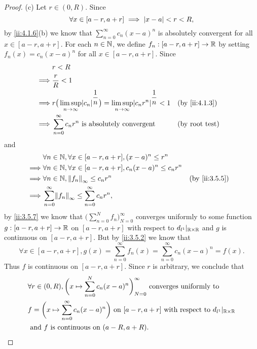 \begin{proof}{(c)}
  Let \(r \in (0, R)\).
  Since
  \[
    \forall x \in [a - r, a + r] \implies \left\lvert x - a\right\rvert < r < R,
  \]
  by \cref{ii:4.1.6}(b) we know that \(\sum_{n = 0}^\infty c_n (x - a)^n\) is absolutely convergent for all \(x \in [a - r, a + r]\).
  For each \(n \in \mathbb{N}\), we define \(f_n : [a - r, a + r] \to \mathbb{R}\) by setting \(f_n(x) = c_n (x - a)^n\) for all \(x \in [a - r, a + r]\).
  Since
  \begin{align*}
             & r < R                                                                                                                                            \\
    \implies & \dfrac{r}{R} < 1                                                                                                                                 \\
    \implies & r \big(\limsup_{n \to \infty} \abs{c_n}^{\dfrac{1}{n}}\big) = \limsup_{n \to \infty} \abs{c_n r^n}^{\dfrac{1}{n}} < 1 &  & \by{ii:4.1.3}            \\
    \implies & \sum_{n = 0}^\infty c_n r^n \text{ is absolutely convergent}                                                          &  & \text{(by root test)}
  \end{align*}
  and
  \begin{align*}
             & \forall n \in \N, \forall x \in [a - r, a + r], (x - a)^n \leq r^n                         \\
    \implies & \forall n \in \N, \forall x \in [a - r, a + r], c_n (x - a)^n \leq c_n r^n                 \\
    \implies & \forall n \in \N, \norm*{f_n}_\infty \leq c_n r^n                          &  & \by{ii:3.5.5} \\
    \implies & \sum_{n = 0}^\infty \norm*{f_n}_\infty \leq \sum_{n = 0}^\infty c_n r^n,
  \end{align*}
  by \cref{ii:3.5.7} we know that \(\big(\sum_{n = 0}^N f_n\big)_{N = 0}^\infty\) converges uniformly to some function \(g : [a - r, a + r] \to \mathbb{R}\) on \([a - r, a + r]\) with respect to \(d_{l^1}|_{\mathbb{R} \times \mathbb{R}}\) and \(g\) is continuous on \([a - r, a + r]\).
  But by \cref{ii:3.5.2} we know that
  \[
    \forall x \in [a - r, a + r], g(x) = \sum_{n = 0}^\infty f_n(x) = \sum_{n = 0}^\infty c_n (x - a)^n = f(x).
  \]
  Thus \(f\) is continuous on \([a - r, a + r]\).
  Since \(r\) is arbitrary, we conclude that
  \begin{align*}
     & \forall r \in (0, R), \bigg(x \mapsto \sum_{n = 0}^N c_n (x - a)^n\bigg)_{N = 0}^\infty \text{ converges uniformly to }                 \\
     & f = \bigg(x \mapsto \sum_{n = 0}^\infty c_n (x - a)^n\bigg) \text{ on } [a - r, a + r] \text{ with respect to } d_{l^1}|_{\mathbb{R} \times \mathbb{R}} \\
     & \text{ and } f \text{ is continuous on } (a - R, a + R).
  \end{align*}
\end{proof}

